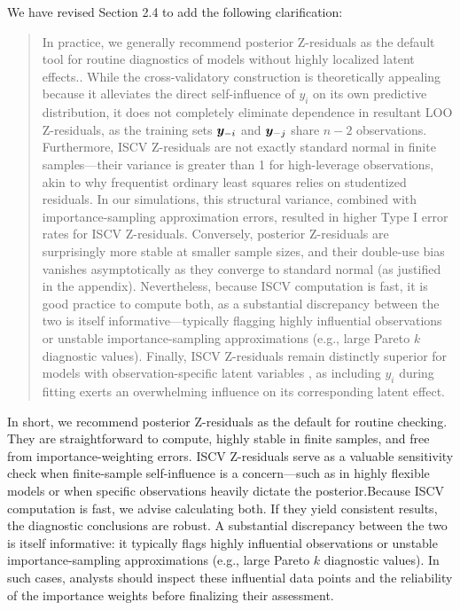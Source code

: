 \documentclass[11pt]{article}
\begin{document}
We have revised Section 2.4 to add the following clarification: 
\begin{quote}
In practice, we generally recommend posterior Z-residuals as the default tool for routine diagnostics of models without highly localized latent effects.. While the cross-validatory construction is theoretically appealing because it alleviates the direct self-influence of $y_i$ on its own predictive distribution, it does not completely eliminate dependence in resultant LOO Z-residuals, as the training sets $\bm{y}_{-i}$ and $\bm{y}_{-j}$ share $n-2$ observations. Furthermore, ISCV Z-residuals are not exactly standard normal in finite samples---their variance is greater than 1 for high-leverage observations, akin to why frequentist ordinary least squares relies on studentized residuals. In our simulations, this structural variance, combined with importance-sampling approximation errors, resulted in higher Type I error rates for ISCV Z-residuals. Conversely, posterior Z-residuals are surprisingly more stable at smaller sample sizes, and their double-use bias vanishes asymptotically as they converge to standard normal (as justified in the appendix). Nevertheless, because ISCV computation is fast, it is good practice to compute both, as a substantial discrepancy between the two is itself informative—typically flagging highly influential observations or unstable importance-sampling approximations (e.g., large Pareto $k$ diagnostic values). Finally, ISCV Z-residuals remain distinctly superior for models with observation-specific latent variables \citep{Li2016,Millar2018}, as including $y_i$ during fitting exerts an overwhelming influence on its corresponding latent effect.
\end{quote}
In short, we recommend posterior Z-residuals as the default for routine checking. They are straightforward to compute, highly stable in finite samples, and free from importance-weighting errors. ISCV Z-residuals serve as a valuable sensitivity check when finite-sample self-influence is a concern—such as in highly flexible models or when specific observations heavily dictate the posterior.Because ISCV computation is fast, we advise calculating both. If they yield consistent results, the diagnostic conclusions are robust. A substantial discrepancy between the two is itself informative: it typically flags highly influential observations or unstable importance-sampling approximations (e.g., large Pareto $k$ diagnostic values). In such cases, analysts should inspect these influential data points and the reliability of the importance weights before finalizing their assessment.
\end{document}
